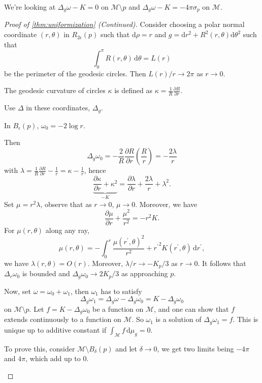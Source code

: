 \begin{prev}
	We're looking at \(\Delta _g \omega - K = 0\) on \(\mathcal{M} \setminus p\) and \(\Delta _g \omega - K = -4 \pi \sigma _p\) on \(\mathcal{M} \).
\end{prev}

\begin{proof}[Proof of \autoref{thm:uniformization} (Continued)]
	Consider choosing a polar normal coordinate \((r, \theta )\) in \(R_{2 \epsilon }(p)\) such that \(\mathrm{d} \rho = r\) and \(g = \mathrm{d} r^2 + R^2(r, \theta )\mathrm{d} \theta ^2\) such that
	\[
		\int_{0}^{\pi } R(r, \theta ) \,\mathrm{d}\theta = L(r)
	\]
	be the perimeter of the geodesic circles. Then \(L(r) / r \to 2\pi \) as \(r \to 0\).

	\begin{notation}
		The geodesic curvature of circles \(\kappa \) is defined as \(\kappa = \frac{1}{R} \frac{\partial R}{\partial r} \).
	\end{notation}

	Use \(\Delta \) in these coordinates, \(\Delta _g\).

	\begin{prev}
		In \(B_{\epsilon } (p)\), \(\omega _0=-2\log r\).
	\end{prev}

	Then
	\[
		\Delta _g \omega _0 = - \frac{2}{R} \frac{\partial R}{\partial r} \left( \frac{R}{r} \right) = - \frac{2\lambda }{r}
	\]
	with \(\lambda = \frac{1}{R} \frac{\partial R}{\partial r} - \frac{1}{r} = \kappa - \frac{1}{r}\), hence
	\[
		\underbrace{\frac{\partial \kappa }{\partial r} + \kappa ^2}_{-K } = \frac{\partial \lambda }{\partial r} + \frac{2\lambda }{r}+ \lambda ^2 .
	\]
	Set \(\mu = r^2 \lambda \), observe that as \(r \to 0\), \(\mu \to 0\). Moreover, we have
	\[
		\frac{\partial \mu }{\partial r} + \frac{\mu ^2}{r^2} = -r^2 K.
	\]
	For \(\mu (r, \theta )\) along any ray,
	\[
		\mu (r, \theta )
		= - \int_{0}^{r} \frac{\mu (r^{\prime} , \theta )^2}{r^2} + {r^{\prime} }^2 K (r^{\prime} , \theta )  \,\mathrm{d}r^{\prime},
	\]
	we have \(\lambda (r, \theta ) = O(r)\). Moreover, \(\lambda / r \to - K_p / 3\) as \(r \to 0\). It follows that \(\Delta _r \omega _0\) is bounded and \(\Delta _g \omega _0 \to 2K_p / 3\) as approaching \(p\).

	Now, set \(\omega = \omega _0 + \omega _1\), then \(\omega _1\) has to satisfy
	\[
		\Delta _g \omega _1
		= \Delta _g \omega - \Delta _g \omega _0
		= K - \Delta _g \omega _0
	\]
	on \(\mathcal{M} \setminus p\). Let \(f = K - \Delta _g \omega _0\) be a function on \(\mathcal{M} \), and one can show that \(f\) extends continuously to a function on \(\mathcal{M} \). So \(\omega _1\) is a solution of \(\Delta _g \omega _1 = f\). This is unique up to additive constant if \(\int _\mathcal{M} f \,\mathrm{d} \mu _g = 0\).
	\begin{intuition}
		To prove this, consider \(\mathcal{M} \setminus B_\delta (p)\) and let \(\delta \to 0\), we get two limits being \(-4\pi \) and \(4\pi \), which add up to \(0\).
	\end{intuition}
\end{proof}
